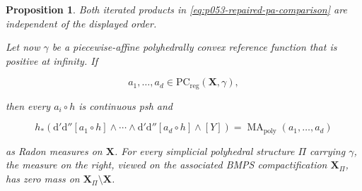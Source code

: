 \documentclass[11pt,a4paper]{article}
\newtheorem{proposition}[proposition]{Proposition}
\theoremstyle{definition}
\theoremstyle{remark}
\newcommand{\rd}{\mathrm d}
\newcommand{\dprime}{\rd'}
\newcommand{\ddprime}{\rd''}
\newcommand{\dprimeddprime}{\dprime\ddprime}
\DeclareMathOperator{\MA}{MA}
\begin{document}
\begin{proposition}
Both iterated products in \eqref{eq:p053-repaired-pa-comparison} are
independent of the displayed order.

Let now \(\gamma\) be a piecewise-affine polyhedrally convex reference
function that is positive at infinity.  If

\[
 a_1,\ldots,a_d\in\mathrm{PC}_{\mathrm{reg}}(\mathbf X,\gamma),
\]

then every \(a_i\circ h\) is continuous psh and

\begin{equation}
 h_*\!\left(
   \dprimeddprime[a_1\circ h]\wedge\cdots\wedge
   \dprimeddprime[a_d\circ h]\wedge[Y]
 \right)
 =\MA_{\mathrm{poly}}(a_1,\ldots,a_d)
 \label{eq:p053-repaired-regularizable-comparison}
\end{equation}

as Radon measures on \(\mathbf X\).  For every simplicial polyhedral
structure \(\Pi\) carrying \(\gamma\), the measure on the right, viewed on
the associated BMPS compactification \(\mathbf X_\Pi\), has zero mass on
\(\mathbf X_\Pi\setminus\mathbf X\).
\end{proposition}
\end{document}
